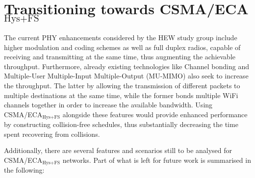 \section{Transitioning towards CSMA/ECA$_{\text{Hys+FS}}$}\label{ECAtoCA}

The current PHY enhancements considered by the HEW study group include higher modulation and coding schemes as well as full duplex radios, capable of receiving and transmitting at the same time, thus augmenting the achievable throughput. Furthermore, already existing technologies like Channel bonding and Multiple-User Multiple-Input Multiple-Output (MU-MIMO) also seek to increase the throughput. The latter by allowing the transmission of different packets to multiple destinations at the same time, while the former bonds multiple WiFi channels together in order to increase the available bandwidth. Using CSMA/ECA$_{\text{Hys+FS}}$ alongside these features would provide enhanced performance by constructing collision-free schedules, thus substantially decreasing the time spent recovering from collisions.

Additionally, there are several features and scenarios still to be analysed for CSMA/ECA$_{\text{Hys+FS}}$ networks. Part of what is left for future work is summarised in the following:


